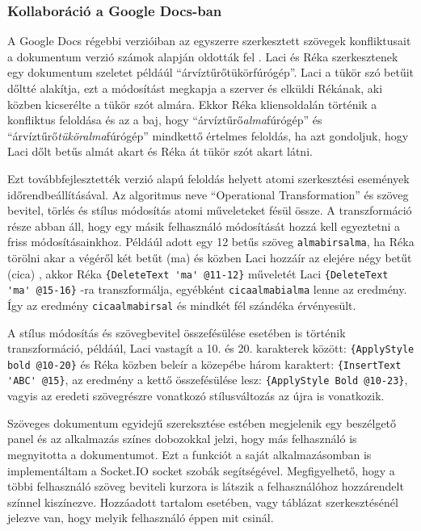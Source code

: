 \subsubsection{Kollaboráció a Google Docs-ban}

A Google Docs régebbi verzióiban az egyszerre szerkesztett szövegek konfliktusait a dokumentum verzió számok alapján oldották fel \cite{googcoll1}. Laci és Réka szerkesztenek egy dokumentum szeletet példáúl ``árvíztűrőtükörfúrógép''. Laci a tükör szó betűit dőltté alakítja, ezt a módosítást megkapja a szerver és elküldi Rékának, aki közben kicserélte a tükör szót almára. Ekkor Réka kliensoldalán történik a konfliktus feloldása és az a baj, hogy ``árvíztűrő\emph{alma}fúrógép'' és ``árvíztűrő\emph{tükör}\emph{alma}fúrógép'' mindkettő értelmes feloldás, ha azt gondoljuk, hogy Laci dőlt betűs almát akart és Réka át tükör szót akart látni.

Ezt továbbfejlesztették verzió alapú feloldás helyett atomi szerkesztési események időrendbeállításával. Az algoritmus neve ``Operational Transformation'' \cite{googcoll2} és szöveg bevitel, törlés és stílus módosítás atomi műveleteket fésül össze. A transzformáció része abban áll, hogy egy másik felhasználó módosítását hozzá kell egyeztetni a friss módosításainkhoz. Példáúl adott egy 12 betűs szöveg \lstinline{almabirsalma}, ha Réka törölni akar a végéről két betűt (ma) és közben Laci hozzáír az elejére négy betűt (cica) , akkor Réka \lstinline|{DeleteText 'ma' @11-12}| műveletét Laci \lstinline|{DeleteText 'ma' @15-16}| -ra transzformálja, egyébként \lstinline{cicaalmabialma} lenne az eredmény. Így az eredmény \lstinline{cicaalmabirsal} és mindkét fél szándéka érvényesült.

A stílus módosítás és szövegbevitel összefésülése esetében is történik transzformáció, példáúl, Laci vastagít a 10. és 20. karakterek között: \lstinline|{ApplyStyle bold @10-20}| és Réka közben beleír a közepébe három karaktert: \lstinline|{InsertText 'ABC' @15}|, az eredmény a kettő összefésülése lesz:  \lstinline|{ApplyStyle Bold @10-23}|, vagyis az eredeti szövegrészre vonatkozó stílusváltozás az újra is vonatkozik.

Szöveges dokumentum egyidejű szereksztése estében megjelenik egy beszélgető panel és az alkalmazás színes dobozokkal jelzi, hogy más felhasználó is megnyitotta a dokumentumot. Ezt a funkciót a saját alkalmazásomban is implementáltam a Socket.IO socket szobák segítségével. Megfigyelhető, hogy a többi felhasználó szöveg beviteli kurzora is látszik a felhasználóhoz hozzárendelt színnel kiszínezve. Hozzáadott tartalom esetében, vagy táblázat szerkesztésénél jelezve van, hogy melyik felhasználó éppen mit csinál.

